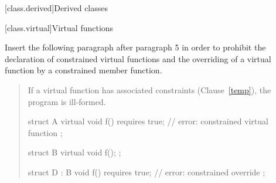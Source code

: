 
\setcounter{chapter}{9}
[class.derived]{Derived classes}

\setcounter{section}{2}
[class.virtual]{Virtual functions}

Insert the following paragraph after paragraph 5 in order to
prohibit the declaration of constrained virtual functions and
the overriding of a virtual function by a constrained member
function.

\begin{quote}
\begin{addedblock}
\setcounter{Paras}{5}

\pnum
If a virtual function has associated constraints (Clause~\ref{temp}), the 
program is ill-formed.
%
\enterexample
\begin{codeblock}
struct A {
  virtual void f() requires true; // error: constrained virtual function
};

struct B {
  virtual void f();
};

struct D : B {
  void f() requires true; // error: constrained override
};
\end{codeblock}
\exitexample
\end{addedblock}
\end{quote}

